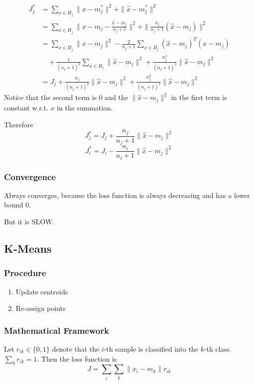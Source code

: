 \begin{align*}
    J_j^* & = \sum_{x\in H_j}\| x-m_j^* \|^2 + \| \hat{x} - m_j^* \|^2                                                \\
          & = \sum_{x\in H_j}\|x-m_j-\frac{\hat{x}-m_j}{n_j+1}\|^2 + \| \frac{n_j}{n_j+1}(\hat{x}-m_j) \|^2           \\
          & = \sum_{x\in H_j} \| x - m_j \|^2 - \frac{2}{n_j+1}\sum_{x\in H_j}(\hat{x}-m_j)^T(x-m_j)                  \\
          & \quad + \frac{1}{(n_j+1)^2}\sum_{x\in H_j}\| \hat{x} -m_j \|^2 + \frac{n_j^2}{(n_j+1)^2}\|\hat{x}-m_j\|^2 \\
          & = J_j + \frac{n_j}{(n_j+1)^2}\|\hat{x}-m_j\|^2 + \frac{n_j^2}{(n_j+1)^2}\|\hat{x}-m_j\|^2
\end{align*}
Notice that the second term is $0$ and the $\|\hat{x}-m_j\|^2$ in the first term is constant w.r.t. $x$ in the summation.

Therefore
\[ J^*_j = J_j + \frac{n_j}{n_j+1}\|\hat{x}-m_j\|^2 \]
\[ J^*_i = J_i - \frac{n_i}{n_i+1}\|\hat{x}-m_j\|^2 \]

\subsubsection{Convergence}
Always converges, because the loss function is always decreasing and has a lower bound $0$.

But it is SLOW.

\subsection{K-Means}
\subsubsection{Procedure}
\begin{enumerate}
    \item Update centroids
    \item Re-assign points
\end{enumerate}

\subsubsection{Mathematical Framework}
Let $r_{ik} \in \{0,1\}$ denote that the $i$-th sample is classified into the $k$-th class. $\sum_kr_{ik} = 1$. Then the loss function is
\[ J = \sum_i \sum_k \| x_i - m_k \|r_{ik} \]

